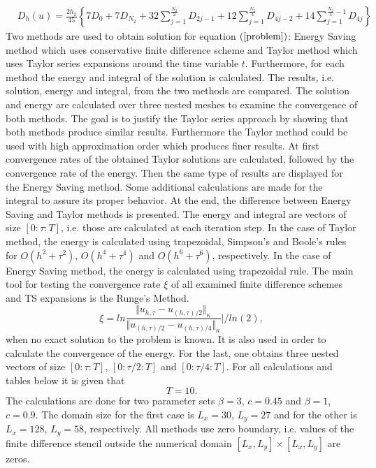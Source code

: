 \documentclass{article}
\newcommand{\rf}[1]{(\ref{#1})}
\begin{document}
\begin{align}\label{quadr6-2D}
&D_h(u) =
\frac{2h_2}{45} 
\left\{
7D_{0}+7D_{N_2}+32 \sum_{j=1}^{\frac{N_2}{2}}D_{2j-1}
+12\sum_{j=1}^{\frac{N_2}{4}}D_{4j-2}
+14 \sum_{j=1}^{\frac{N_2}{4}-1}D_{4j}
\right\}
\end{align}
Two methods are used to obtain solution for equation $\rf{problem}$: Energy Saving method which uses conservative finite difference scheme and Taylor method which uses Taylor series expansions around the time variable $t$. Furthermore, for each method the energy and integral of the solution is calculated. The results, i.e. solution, energy and integral, from the two methods are compared. The solution and energy are calculated over three nested meshes to examine the convergence of both methods. The goal is to justify the Taylor series approach by showing that both methods produce similar results. Furthermore the Taylor method could be used with high approximation order which produces finer results.
At first convergence rates of the obtained Taylor solutions are calculated, followed by the convergence rate of the energy. Then the same type of results are displayed for the Energy Saving method. Some additional calculations are made for the integral to assure its proper behavior. At the end, the difference between Energy Saving and Taylor methods is presented. The energy and integral are vectors of size $[0:\tau:T]$, i.e. those are calculated at each iteration step. In the case of Taylor method, the energy is calculated using trapezoidal, Simpson's and Boole's rules for $O(h^{2} + \tau^2 )$, $O(h^{4} + \tau^4 )$ and $O(h^{6} + \tau^6 )$, respectively. In the case of Energy Saving method, the energy is calculated using trapezoidal rule. The main tool for testing the convergence rate $\xi$ of all examined finite difference schemes and TS expansions is the Runge's Method. 
\begin{equation}\label{Runge}
\xi = ln  \frac{\Vert u_{h,\tau} - u_{(h,\tau)/2} \Vert_\kappa } {\Vert  u_{(h,\tau)/2} - u_{(h,\tau)/4} \Vert_\kappa  } | / ln(2),
\end{equation}
when no exact solution to the problem is known. It is also used in order to calculate the convergence of the energy. For the last, one obtains three nested vectors of size $[0:\tau:T]$, $[0:\tau/2:T]$ and $[0:\tau/4:T]$. For all calculations and tables below it is given that $$T=10.$$ The calculations are done for two parameter sets $\beta = 3$, $c=0.45$ and $\beta = 1$, $c=0.9$. The domain size for the first case is $L_x = 30$, $L_y = 27$ and for the other is  $L_x = 128$, $L_y = 58$, respectively. All methods use zero boundary, i.e. values of the finite difference stencil outside the numerical domain $[L_x, L_y] \times [L_x, L_y]$ are zeros.
\end{document}
